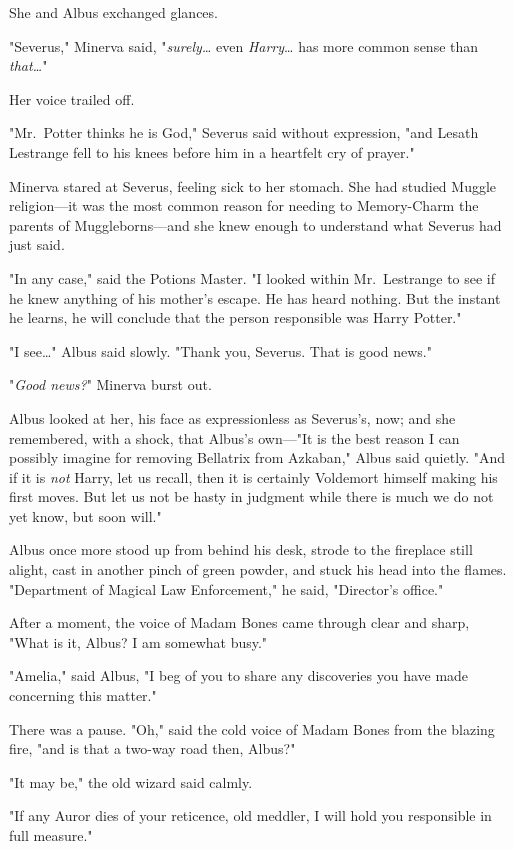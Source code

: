 She and Albus exchanged glances.

"Severus," Minerva said, "\emph{surely{\ldots}} even \emph{Harry}{\ldots} has 
more common sense than \emph{that{\ldots}}"

Her voice trailed off.

"Mr.~Potter thinks he is God," Severus said without expression, "and Lesath 
Lestrange fell to his knees before him in a heartfelt cry of prayer."

Minerva stared at Severus, feeling sick to her stomach. She had studied Muggle 
religion---it was the most common reason for needing to Memory-Charm the 
parents of Muggleborns---and she knew enough to understand what Severus had 
just said.

"In any case," said the Potions Master. "I looked within Mr.~Lestrange to see 
if he knew anything of his mother's escape. He has heard nothing. But the 
instant he learns, he will conclude that the person responsible was Harry 
Potter."

"I see{\ldots}" Albus said slowly. "Thank you, Severus. That is good news."

"\emph{Good news?}" Minerva burst out.

Albus looked at her, his face as expressionless as Severus's, now; and she 
remembered, with a shock, that Albus's own---"It is the best reason I can 
possibly imagine for removing Bellatrix from Azkaban," Albus said quietly. "And 
if it is \emph{not} Harry, let us recall, then it is certainly Voldemort 
himself making his first moves. But let us not be hasty in judgment while there 
is much we do not yet know, but soon will."

Albus once more stood up from behind his desk, strode to the fireplace still 
alight, cast in another pinch of green powder, and stuck his head into the 
flames. "Department of Magical Law Enforcement," he said, "Director's office."

After a moment, the voice of Madam Bones came through clear and sharp, "What is 
it, Albus? I am somewhat busy."

"Amelia," said Albus, "I beg of you to share any discoveries you have made 
concerning this matter."

There was a pause. "Oh," said the cold voice of Madam Bones from the blazing 
fire, "and is that a two-way road then, Albus?"

"It may be," the old wizard said calmly.

"If any Auror dies of your reticence, old meddler, I will hold you responsible 
in full measure."

